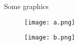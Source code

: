 \documentclass[a4paper,12pt]{article}
\begin{document}
%
\noindent
{\Large Some graphics}
%
\begin{figure}[H]
\centering
\texttt{[image: a.png]}
\end{figure}
%
\begin{figure}[H]
\centering
\texttt{[image: b.png]}
\end{figure}
%
\end{document}
